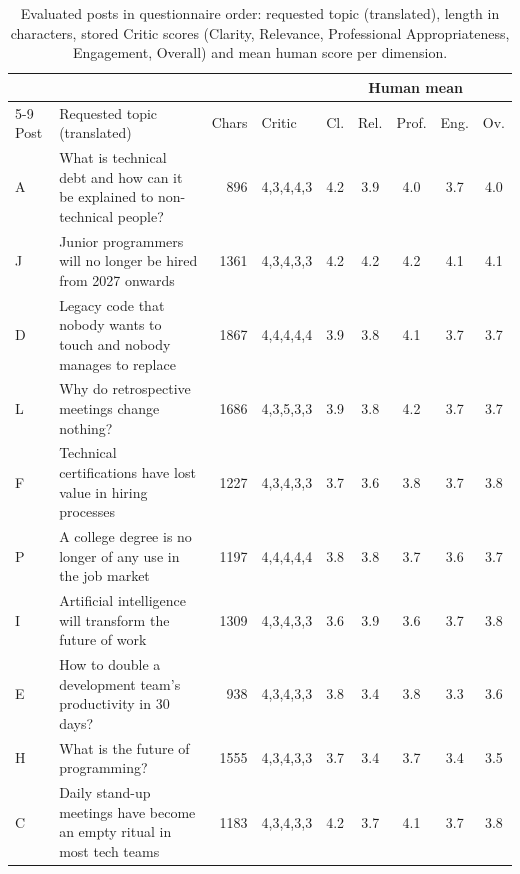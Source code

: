 \documentclass[a4paper,twoside]{article}
\begin{document}
\begin{table}[h]
\centering
\caption{Evaluated posts in questionnaire order: requested topic (translated), length in characters, stored Critic scores (Clarity, Relevance, Professional Appropriateness, Engagement, Overall) and mean human score per dimension.}
\label{tab:posts}
\footnotesize
\begin{tabular}{lp{6.2cm}rlccccc}
\toprule
 & & & & \multicolumn{5}{c}{Human mean} \\
\cmidrule(lr){5-9}
Post & Requested topic (translated) & Chars & Critic & Cl. & Rel. & Prof. & Eng. & Ov. \\
\midrule
A & What is technical debt and how can it be explained to non-technical people? & 896 & 4,3,4,4,3 & 4.2 & 3.9 & 4.0 & 3.7 & 4.0 \\
J & Junior programmers will no longer be hired from 2027 onwards & 1361 & 4,3,4,3,3 & 4.2 & 4.2 & 4.2 & 4.1 & 4.1 \\
D & Legacy code that nobody wants to touch and nobody manages to replace & 1867 & 4,4,4,4,4 & 3.9 & 3.8 & 4.1 & 3.7 & 3.7 \\
L & Why do retrospective meetings change nothing? & 1686 & 4,3,5,3,3 & 3.9 & 3.8 & 4.2 & 3.7 & 3.7 \\
F & Technical certifications have lost value in hiring processes & 1227 & 4,3,4,3,3 & 3.7 & 3.6 & 3.8 & 3.7 & 3.8 \\
P & A college degree is no longer of any use in the job market & 1197 & 4,4,4,4,4 & 3.8 & 3.8 & 3.7 & 3.6 & 3.7 \\
I & Artificial intelligence will transform the future of work & 1309 & 4,3,4,3,3 & 3.6 & 3.9 & 3.6 & 3.7 & 3.8 \\
E & How to double a development team's productivity in 30 days? & 938 & 4,3,4,3,3 & 3.8 & 3.4 & 3.8 & 3.3 & 3.6 \\
H & What is the future of programming? & 1555 & 4,3,4,3,3 & 3.7 & 3.4 & 3.7 & 3.4 & 3.5 \\
C & Daily stand-up meetings have become an empty ritual in most tech teams & 1183 & 4,3,4,3,3 & 4.2 & 3.7 & 4.1 & 3.7 & 3.8 \\
\bottomrule
\end{tabular}
\end{table}
\end{document}
